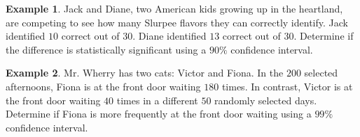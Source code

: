 \documentclass[12pt]{amsart}
\theoremstyle{definition}
\newtheorem{ex}{Example}
\begin{document}
\begin{ex}
	Jack and Diane, two American kids growing up in the heartland, are competing to see how many Slurpee flavors they can correctly identify. Jack identified $10$ correct out of $30$. Diane identified $13$ correct out of $30$. Determine if the difference is statistically significant using a $90\%$ confidence interval.
\end{ex}

\begin{ex}
	Mr. Wherry has two cats: Victor and Fiona. In the $200$ selected afternoons, Fiona is at the front door waiting $180$ times. In contrast, Victor is at the front door waiting $40$ times in a different $50$ randomly selected days. Determine if Fiona is more frequently at the front door waiting using a $99\%$ confidence interval.
\end{ex}
\end{document}
